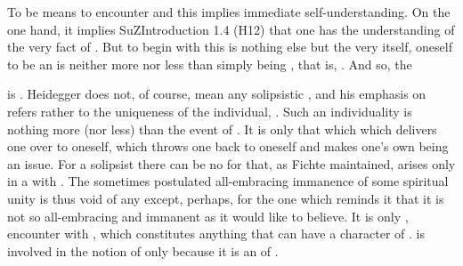 \pa To be  means to encounter  and this implies
immediate self-under\-stand\-ing. On the one hand, it implies \citet{being in
  such a way that one has an understanding of Being,}{SuZ}{Introduction 1.4
  (H12) } that one has the understanding of the very fact of
. But to begin with this  is nothing else
but the very  itself,  oneself to be an
 is neither more nor less than simply being , that is,
.  And so, the 

 is .  Heidegger does not, of course, mean
any solipsistic , and his emphasis on  refers rather
to the uniqueness of the individual, .  Such an
individuality is nothing more (nor less) than the event of .
It is only that which  which delivers one over to oneself, which
throws one back to oneself and makes one's own being an issue.  For a solipsist
there can be no  for that, as Fichte maintained, arises only in a
 with . The sometimes postulated all-embracing
immanence of some spiritual unity is thus void of any  except,
perhaps, for the one which reminds it that it is not so all-embracing and
immanent as it would like to believe. It is only , encounter
with , which constitutes anything that can have a character of
.  is involved in the notion of 
only because it is an  of .
  
